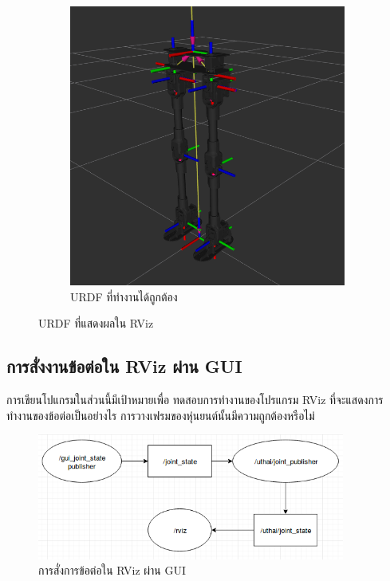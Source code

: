 \begin{figure}[!ht]
\begin{subfigure}[b]{0.5\textwidth}
        \includegraphics[width=\textwidth]{chapter4/images/urdf_rviz2.png}
        \caption{URDF ที่ทำงานได้ถูกต้อง}
    \end{subfigure}
    \caption{URDF ที่แสดงผลใน RViz}
\end{figure}

\clearpage
\subsection{การสั่งงานข้อต่อใน RViz ผ่าน GUI}
การเขียนโปแกรมในส่วนนี้มีเป้าหมายเพื่อ ทดสอบการทำงานของโปรแกรม RViz ที่จะแสดงการทำงานของข้อต่อเป็นอย่างไร
การวางเฟรมของหุ่นยนต์นั้นมีความถูกต้องหรือไม่
\begin{figure}[!ht]
	\centering
	\includegraphics[width=0.9\textwidth]{chapter3/images/uthai_joint_gui.png}
	\caption{การสั่งการข้อต่อใน RViz ผ่าน GUI}
\end{figure}

